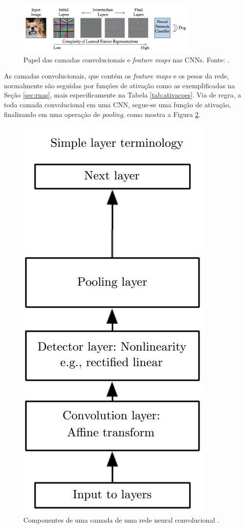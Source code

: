 \begin{figure}[!h]
	\centering
	\caption{Papel das camadas convolucionais e \emph{feature maps} nas CNNs. Fonte: \cite{Khan:Livro}.}
	\label{fig:convolutions}
	\includegraphics[width=0.8\textwidth]{./img/fundamenta/convolutions}
\end{figure}

As camadas convolucionais, que contém os \emph{feature maps} e os pesos da rede, normalmente são seguidas por funções de ativação como as exemplificadas na Seção \ref{sec:rnas}, mais especificamente na Tabela \ref{tab:ativacoes}. Via de regra, a toda camada convolucional em uma CNN, segue-se uma função de ativação, finalizando em uma operação de \emph{pooling}, como mostra a Figura \ref{fig:cnn_camada}.

\begin{figure}
	\centering
	\caption{Componentes de uma camada de uma rede neural convolucional \cite{goodfellow2016deep}.}
	\label{fig:cnn_camada}
	\includegraphics[height=0.3\textheight]{img/cnn_camada.png}
\end{figure}

